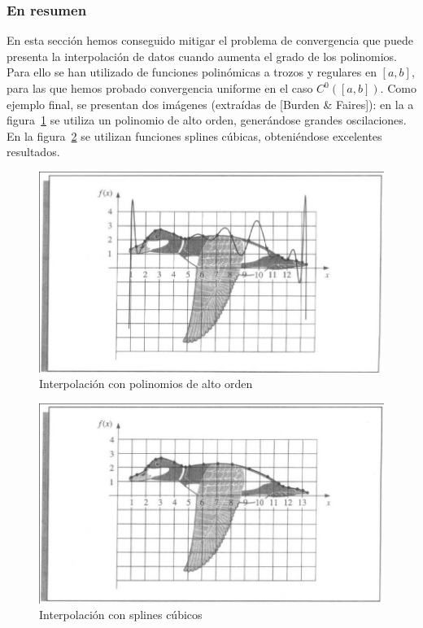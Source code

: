 \subsubsection*{En resumen}
En esta sección hemos conseguido mitigar el problema de convergencia
que puede presenta la interpolación de datos cuando aumenta el grado
de los polinomios. Para ello se han utilizado de funciones polinómicas
a trozos y regulares en $[a,b]$, para las que hemos probado
convergencia uniforme en el caso $C^0([a,b])$. Como ejemplo final, se
presentan dos imágenes (extraídas de [Burden \& Faires]): en la a
figura~\ref{fig:pato-alto-orden} se utiliza un polinomio de alto
orden, generándose grandes oscilaciones. En la
figura~\ref{fig:pato-spline} se utilizan funciones splines cúbicas,
obteniéndose excelentes resultados.

\begin{figure}
  \centering
  \includegraphics[width=0.8\linewidth]{tema2/pato-interpol}
  \caption{Interpolación con polinomios de alto orden}
  \label{fig:pato-alto-orden}
\end{figure}

\begin{figure}
  \centering
  \includegraphics[width=0.8\linewidth]{tema2/pato-spline}
  \caption{Interpolación con splines cúbicos}
  \label{fig:pato-spline}
\end{figure}

